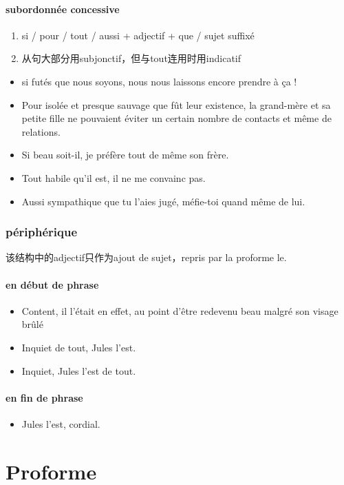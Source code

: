 \documentclass[UTF8]{report}
\begin{document}
\subsubsection{subordonnée concessive}
\begin{enumerate}
    \item si / pour / tout / aussi + adjectif + que / sujet suffixé 
    \item 从句大部分用subjonctif，但与tout连用时用indicatif
\end{enumerate}
\begin{itemize}
    \item si futés que nous soyons, nous nous laissons encore prendre à ça !
    \item Pour isolée et presque sauvage que fût leur existence, la grand-mère et sa petite fille ne pouvaient éviter un certain nombre de contacts et même de relations.
    \item Si beau soit-il, je préfère tout de même son frère.
    \item Tout habile qu’il est, il ne me convainc pas.
    \item Aussi sympathique que tu l’aies jugé, méfie-toi quand même de lui.
\end{itemize}

\subsection{périphérique}
该结构中的adjectif只作为ajout de sujet，repris par la proforme le.
\subsubsection{en début de phrase }
\begin{itemize}
    \item Content, il l’était en effet, au point d’être redevenu beau malgré son visage brûlé
    \item Inquiet de tout, Jules l’est.
    \item Inquiet, Jules l’est de tout.
\end{itemize}
\subsubsection{en fin de phrase }
\begin{itemize}
    \item Jules l’est, cordial.
\end{itemize}

\chapter{Proforme}
\end{document}
